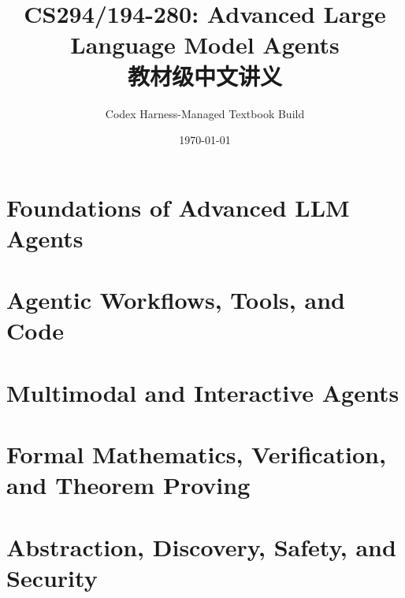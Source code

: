 \documentclass[a4paper]{ctexbook}
\title{CS294/194-280: Advanced Large Language Model Agents\\教材级中文讲义}
\author{Codex Harness-Managed Textbook Build}
\date{\today}
\begin{document}
\maketitle
\frontmatter


\tableofcontents
\newpage
\mainmatter
\part{Foundations of Advanced LLM Agents}




\part{Agentic Workflows, Tools, and Code}


\part{Multimodal and Interactive Agents}


\part{Formal Mathematics, Verification, and Theorem Proving}



\part{Abstraction, Discovery, Safety, and Security}


\appendix









\end{document}
